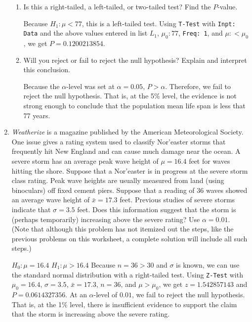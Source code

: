 \begin{enumerate}
\begin{enumerate}
	\item Is this a right-tailed, a left-tailed, or two-tailed test? Find the $P$-value.  
	
	{\answer Because $H_1: \mu < 77$, this is a left-tailed test.  
	Using \texttt{T-Test} with \texttt{Inpt: Data} and the above values entered in list $L_1$, $\mu_0: 77$, \texttt{Freq: 1}, and $\mu: < \mu_0$, we get $P = 0.1200213854$.}  
	
	\item Will you reject or fail to reject the null hypothesis? Explain and interpret this conclusion.  
	
	{\answer Because the $\alpha$-level was set at $\alpha = 0.05$, $P > \alpha$. Therefore, we fail to reject the null hypothesis. That is, at the 5\% level, the evidence is not strong enough to conclude that the population mean life span is less that 77 years.}  
	
	\end{enumerate}

\vfill

\item {\em Weatherize} is a magazine published by the American Meteorological Society. One issue gives a rating system used to classify Nor'easter storms that frequently hit New England and can cause much damage near the ocean. A severe storm has an average peak wave height of $\mu = 16.4$ feet for waves hitting the shore. Suppose that a Nor'easter is in progress at the severe storm class rating. Peak wave heights are usually measured from land (using binoculars) off fixed cement piers. Suppose that a reading of 36 waves showed an average wave height of $\bar{x} = 17.3$ feet. Previous studies of severe storms indicate that $\sigma = 3.5$ feet. Does this information suggest that the storm is (perhaps temporarily) increasing above the severe rating? Use $\alpha = 0.01$.  
(Note that although this problem has not itemized out the steps, like the previous problems on this worksheet, a complete solution will include all such steps.)  

{\answer $H_0: \mu = 16.4$  
$H_1: \mu > 16.4$  
Because $n=36 > 30$ and $\sigma$ is known, we can use the standard normal distribution with a right-tailed test.  
Using \texttt{Z-Test} with $\mu_0 = 16.4$, $\sigma = 3.5$, $\bar{x} = 17.3$, $n=36$, and $\mu > \mu_0$, we get $z = 1.542857143$ and $P = 0.0614327356$.  
At an $\alpha$-level of $0.01$, we fail to reject the null hypothesis.  That is, at the 1\% level, there is insufficient evidence to support the claim that the storm is increasing above the severe rating. }  

\vfill

\end{enumerate}
